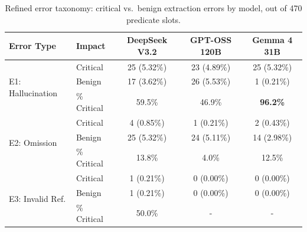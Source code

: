 \begin{table}[htbp]
\centering
\small
\caption{Refined error taxonomy: critical vs.\ benign extraction errors by model, out of 470 predicate slots.}
\label{tab:taxonomy}
\begin{tabular}{llccc}
\toprule
\textbf{Error Type} & \textbf{Impact} & \textbf{DeepSeek V3.2} & \textbf{GPT-OSS 120B} & \textbf{Gemma 4 31B} \\
\midrule
\multirow{3}{*}{E1: Hallucination} & Critical & 25 (5.32\%) & 23 (4.89\%) & 25 (5.32\%) \\
                                    & Benign   & 17 (3.62\%) & 26 (5.53\%) & 1 (0.21\%) \\
                                    & \% Critical & 59.5\% & 46.9\% & \textbf{96.2\%} \\
\midrule
\multirow{3}{*}{E2: Omission}      & Critical & 4 (0.85\%) & 1 (0.21\%) & 2 (0.43\%) \\
                                    & Benign   & 25 (5.32\%) & 24 (5.11\%) & 14 (2.98\%) \\
                                    & \% Critical & 13.8\% & 4.0\% & 12.5\% \\
\midrule
\multirow{3}{*}{E3: Invalid Ref.}   & Critical & 1 (0.21\%) & 0 (0.00\%) & 0 (0.00\%) \\
                                    & Benign   & 1 (0.21\%) & 0 (0.00\%) & 0 (0.00\%) \\
                                    & \% Critical & 50.0\% & - & - \\
\bottomrule
\end{tabular}
\end{table}
